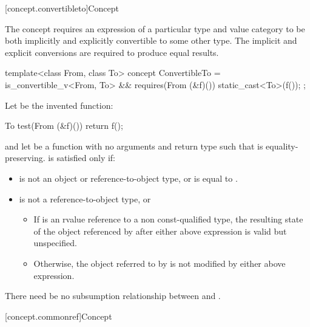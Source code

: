 [concept.convertibleto]{Concept }

\pnum
The  concept requires an expression of a particular
type and value category to be both implicitly and explicitly convertible to some
other type. The implicit and explicit conversions are required to produce equal
results.

%
\begin{itemdecl}
template<class From, class To>
  concept ConvertibleTo =
    is_convertible_v<From, To> &&
    requires(From (&f)()) {
      static_cast<To>(f());
    };
\end{itemdecl}

\begin{itemdescr}
\pnum
Let  be the invented function:
\begin{codeblock}
To test(From (&f)()) {
  return f();
}
\end{codeblock}
and let  be a function with no arguments and return type 
such that  is equality-preserving.
 is satisfied only if:

\begin{itemize}
\item
{} is not an object or reference-to-object type, or
 is equal to .

\item
{} is not a reference-to-object type, or

\begin{itemize}
\item
If  is an rvalue reference to a non const-qualified type, the
resulting state of the object referenced by  after either above
expression is valid but unspecified.

\item
Otherwise, the object referred to by  is not modified by either above
expression.
\end{itemize}

\end{itemize}

\pnum
There need be no subsumption relationship between
and
.
\end{itemdescr}


[concept.commonref]{Concept }

